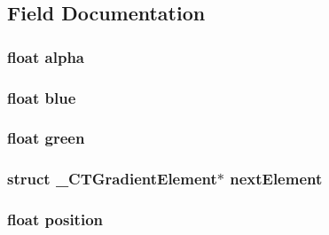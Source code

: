 \subsection{Field Documentation}
\hypertarget{struct___c_t_gradient_element_ab1551d8043c2aa4410fb7dbb1fe3be7b}{
\subsubsection[{alpha}]{\setlength{\rightskip}{0pt plus 5cm}float alpha}}\label{struct___c_t_gradient_element_ab1551d8043c2aa4410fb7dbb1fe3be7b}
\hypertarget{struct___c_t_gradient_element_a322e0de27f54901aa172ae487dba2914}{
\subsubsection[{blue}]{\setlength{\rightskip}{0pt plus 5cm}float blue}}\label{struct___c_t_gradient_element_a322e0de27f54901aa172ae487dba2914}
\hypertarget{struct___c_t_gradient_element_af8d69af46156237d69b44a880e4f486e}{
\subsubsection[{green}]{\setlength{\rightskip}{0pt plus 5cm}float green}}\label{struct___c_t_gradient_element_af8d69af46156237d69b44a880e4f486e}
\hypertarget{struct___c_t_gradient_element_a4a65c2e7b23872e9638ec4d22fd502d6}{
\subsubsection[{next\-Element}]{\setlength{\rightskip}{0pt plus 5cm}struct {\bf \-\_\-\-C\-T\-Gradient\-Element}$\ast$ next\-Element}}\label{struct___c_t_gradient_element_a4a65c2e7b23872e9638ec4d22fd502d6}
\hypertarget{struct___c_t_gradient_element_a76777b356ab2a080225682528119c4fe}{
\subsubsection[{position}]{\setlength{\rightskip}{0pt plus 5cm}float position}}\label{struct___c_t_gradient_element_a76777b356ab2a080225682528119c4fe}
